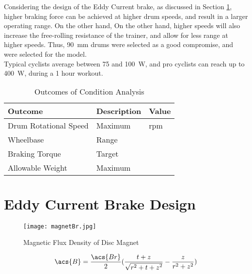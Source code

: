 Considering the design of the Eddy Current brake, as discussed in Section \ref{sec:Eddy}, higher braking force can be achieved at higher drum speeds, and result in a larger operating range. On the other hand,  On the other hand, higher speeds will also increase the free-rolling resistance of the trainer, and allow for less range at higher speeds. Thus, \SI{90}{\milli\meter} drums were selected as a good compromise, and were selected for the model.\\

Typical cyclists average between 75 and \SI{100}{\watt}, and pro cyclists can reach up to \SI{400}{\watt}, during a 1 hour workout.

\begin{table}[H]
	\centering
	\caption{Outcomes of Condition Analysis}
	\begin{tabularx}{\textwidth}{>{\raggedright}X >{\raggedright}p{4cm} >{\raggedright\arraybackslash}p{3cm}}
		\toprule
		Outcome               & Description & Value          \\
		\midrule
		Drum Rotational Speed & Maximum     & 3500 \acs{rpm} \\
		Wheelbase             & Range       &                \\
		Braking Torque        & Target      &                \\
		Allowable Weight      & Maximum     &                \\
		\bottomrule
	\end{tabularx}
	\label{tab:conditions}
\end{table}

\newpage

\section{Eddy Current Brake Design}
\label{sec:Eddy}

\begin{figure}[H]
	\begin{center}
		\texttt{[image: magnetBr.jpg]}
		\caption{Magnetic Flux Density of Disc Magnet}
		\citep[Addapted from][]{Supermagnete:2010}
		\label{fig:B0}
	\end{center}
\end{figure}

\begin{equation}
	\acs{B} = \frac{\acs{Br}}{2} (\frac{t+ z}{\sqrt{r^2 + {t + z}^2}} - \frac{z}{r^2 + z^2})
	\label{eq:B}
\end{equation}

